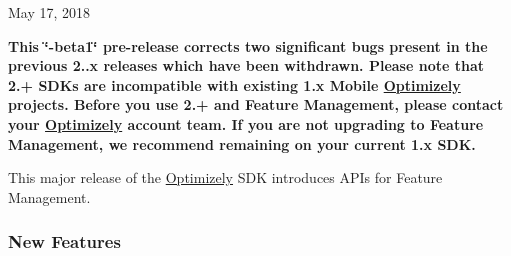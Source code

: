 May 17, 2018

{\bfseries This \char`\"{}-\/beta1\char`\"{} pre-\/release corrects two significant bugs present in the previous 2..\+x releases which have been withdrawn. Please note that 2.+ S\+D\+Ks are incompatible with existing 1.\+x Mobile \mbox{\hyperlink{interface_optimizely}{Optimizely}} projects. Before you use 2.+ and Feature Management, please contact your \mbox{\hyperlink{interface_optimizely}{Optimizely}} account team. If you are not upgrading to Feature Management, we recommend remaining on your current 1.\+x S\+DK.}

This major release of the \mbox{\hyperlink{interface_optimizely}{Optimizely}} S\+DK introduces A\+P\+Is for Feature Management.

\subsubsection*{New Features}


